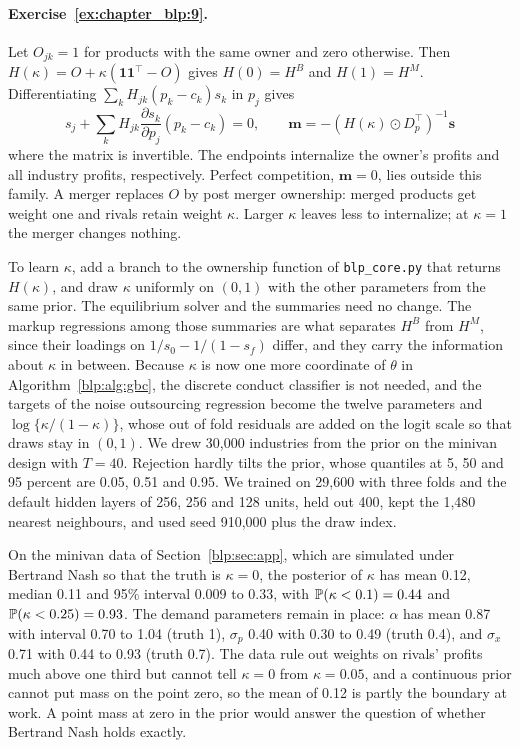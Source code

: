 \paragraph{Exercise~\ref{ex:chapter_blp:9}.} Let $O_{jk} = 1$ for products with the same owner and zero otherwise. Then $H(\kappa) = O + \kappa(\mathbf1\mathbf1^\top - O)$ gives $H(0) = H^B$ and $H(1) = H^M$. Differentiating $\sum_k H_{jk}(p_k-c_k)s_k$ in $p_j$ gives
\[
s_j + \sum_k H_{jk}\frac{\partial s_k}{\partial p_j}(p_k-c_k) = 0,
\qquad
\bm m = -(H(\kappa)\odot D_p^\top)^{-1}\bm s
\]
where the matrix is invertible. The endpoints internalize the owner's profits and all industry profits, respectively. Perfect competition, $\bm m = 0$, lies outside this family. A merger replaces $O$ by post merger ownership: merged products get weight one and rivals retain weight $\kappa$. Larger $\kappa$ leaves less to internalize; at $\kappa = 1$ the merger changes nothing.

To learn $\kappa$, add a branch to the ownership function of \texttt{blp\_core.py} that returns $H(\kappa)$, and draw $\kappa$ uniformly on $(0, 1)$ with the other parameters from the same prior. The equilibrium solver and the summaries need no change. The markup regressions among those summaries are what separates $H^B$ from $H^M$, since their loadings on $1/s_0 - 1/(1 - s_f)$ differ, and they carry the information about $\kappa$ in between. Because $\kappa$ is now one more coordinate of $\theta$ in Algorithm~\ref{blp:alg:gbc}, the discrete conduct classifier is not needed, and the targets of the noise outsourcing regression become the twelve parameters and $\log\{\kappa/(1 - \kappa)\}$, whose out of fold residuals are added on the logit scale so that draws stay in $(0, 1)$. We drew 30,000 industries from the prior on the minivan design with $T = 40$. Rejection hardly tilts the prior, whose quantiles at 5, 50 and 95 percent are 0.05, 0.51 and 0.95. We trained on 29,600 with three folds and the default hidden layers of 256, 256 and 128 units, held out 400, kept the 1,480 nearest neighbours, and used seed 910,000 plus the draw index.

On the minivan data of Section~\ref{blp:sec:app}, which are simulated under Bertrand Nash so that the truth is $\kappa = 0$, the posterior of $\kappa$ has mean 0.12, median 0.11 and 95\% interval 0.009 to 0.33, with $\mathbb{P}(\kappa < 0.1) = 0.44$ and $\mathbb{P}(\kappa < 0.25) = 0.93$. The demand parameters remain in place: $\alpha$ has mean 0.87 with interval 0.70 to 1.04 (truth 1), $\sigma_p$ 0.40 with 0.30 to 0.49 (truth 0.4), and $\sigma_x$ 0.71 with 0.44 to 0.93 (truth 0.7). The data rule out weights on rivals' profits much above one third but cannot tell $\kappa = 0$ from $\kappa = 0.05$, and a continuous prior cannot put mass on the point zero, so the mean of 0.12 is partly the boundary at work. A point mass at zero in the prior would answer the question of whether Bertrand Nash holds exactly.

